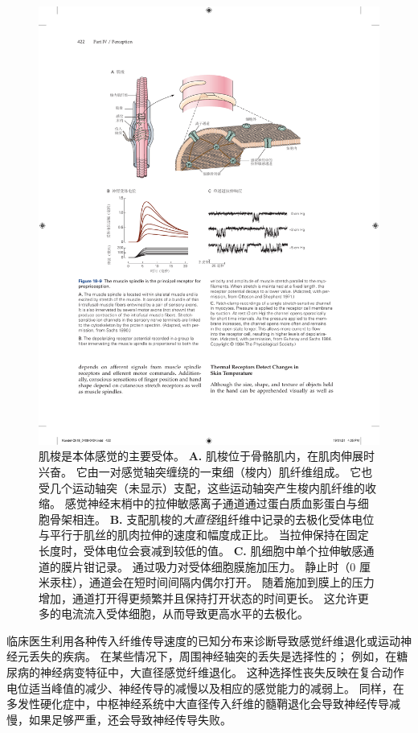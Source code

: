 \begin{figure}[htbp]
	\centering
	\includegraphics[width=1.0\linewidth]{chap18/fig_18_9}
	\caption{肌梭是本体感觉的主要受体。
		\textbf{A.} 肌梭位于骨骼肌内，在肌肉伸展时兴奋。
		它由一对感觉轴突缠绕的一束细（梭内）肌纤维组成。
		它也受几个运动轴突（未显示）支配，这些运动轴突产生梭内肌纤维的收缩。
		感觉神经末梢中的拉伸敏感离子通道通过蛋白质血影蛋白与细胞骨架相连\cite{sachs1992stretch}。
		\textbf{B.} 支配肌梭的\textit{大直径}组纤维中记录的去极化受体电位与平行于肌丝的肌肉拉伸的速度和幅度成正比。 
		当拉伸保持在固定长度时，受体电位会衰减到较低的值\cite{cone1971transducer}。
		\textbf{C.} 肌细胞中单个拉伸敏感通道的膜片钳记录。
		通过吸力对受体细胞膜施加压力。
		静止时（0 厘米汞柱），通道会在短时间间隔内偶尔打开。 
		随着施加到膜上的压力增加，通道打开得更频繁并且保持打开状态的时间更长。
		这允许更多的电流流入受体细胞，从而导致更高水平的去极化\cite{guharay1984stretch}。}
	\label{fig:18_9}
\end{figure}


临床医生利用各种传入纤维传导速度的已知分布来诊断导致感觉纤维退化或运动神经元丢失的疾病。
在某些情况下，周围神经轴突的丢失是选择性的；
例如，在糖尿病的神经病变特征中，大直径感觉纤维退化。
这种选择性丧失反映在复合动作电位适当峰值的减少、神经传导的减慢以及相应的感觉能力的减弱上。
同样，在多发性硬化症中，中枢神经系统中大直径传入纤维的髓鞘退化会导致神经传导减慢，如果足够严重，还会导致神经传导失败。



